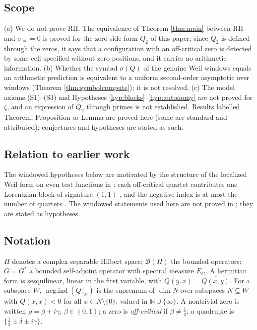 \documentclass[11pt,reqno]{amsart}
\theoremstyle{definition}
\newcommand{\negind}{\operatorname{neg.ind}}
\newcommand{\N}{\mathbb{N}}
\newcommand{\half}{\tfrac12}
\begin{document}
\subsection{Scope}\label{subsec:honest-up-front}
(a) We do not prove RH. The equivalence of Theorem \ref{thm:main} between RH and
\(\sigma_{\mathrm{loc}}=0\) is proved for the zero-side form \(Q_2\) of this
paper; since \(Q_2\) is defined through the zeros, it says that a configuration
with an off-critical zero is detected by some cell specified without zero
positions, and it carries no arithmetic information. (b) Whether the symbol \(\sigma(Q)\) of the genuine
Weil windows equals an arithmetic prediction is equivalent to a uniform
second-order asymptotic over windows (Theorem \ref{thm:symbolcompute}); it is
not resolved. (c) The model axioms (S1)--(S3) and Hypotheses
\ref{hyp:blocks}--\ref{hyp:autonomy} are not proved for \(\zeta\), and an
expression of \(Q_2\) through primes is not established. Results labelled
Theorem, Proposition or Lemma are proved here (some are standard and attributed);
conjectures and hypotheses are stated as such.

\subsection{Relation to earlier work}
The windowed hypotheses below are motivated by the structure of the localized
Weil form on even test functions in \cite{P18}: each off-critical quartet
contributes one Lorentzian block of signature \((1,1)\) \cite[Theorem~3.1]{P18},
and the negative index is at most the number of quartets
\cite[Corollary~6.5]{P18}. The windowed statements used here are not proved in
\cite{P18}; they are stated as hypotheses.

\subsection*{Notation}
\(H\) denotes a complex separable Hilbert space; \(\mathcal B(H)\) the bounded
operators; \(G=G^*\) a bounded self-adjoint operator with spectral measure
\(E_G\). A hermitian form is sesquilinear, linear in the first variable, with
\(Q(y,x)=\overline{Q(x,y)}\). For a subspace \(W\), \(\negind(Q|_W)\) is the
supremum of \(\dim N\) over subspaces \(N\subseteq W\) with \(Q(x,x)<0\) for all
\(x\in N\setminus\{0\}\), valued in \(\N\cup\{\infty\}\). A nontrivial zero is
written \(\rho=\beta+i\gamma\), \(\beta\in(0,1)\); a zero is \emph{off-critical}
if \(\beta\neq\half\); a quadruple is \(\{\half\pm\delta\pm i\gamma\}\).
\end{document}
